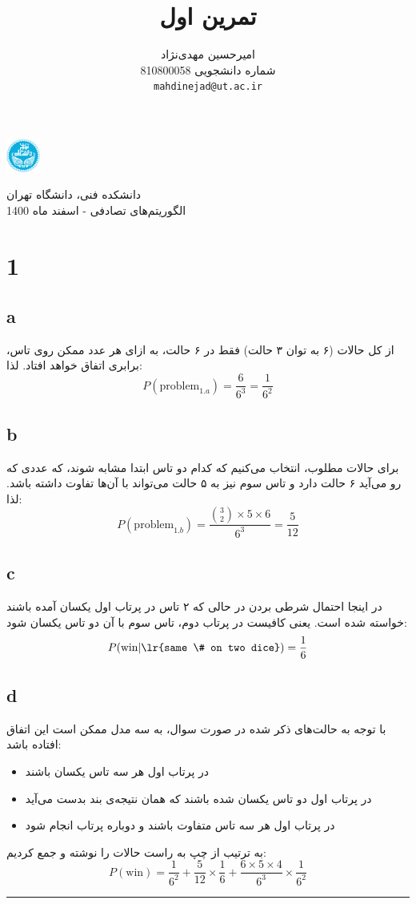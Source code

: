 \documentclass{article}
\title{
تمرین اول
}
\author{%
  امیرحسین مهدی‌نژاد\\
  شماره دانشجویی 810800058\\
  \texttt{mahdinejad@ut.ac.ir} \\
}
\begin{document}
\begin{minipage}{0.1\textwidth}%
\includegraphics[width=1.1cm]{Photos/UT_logo.png}
\end{minipage}%
\hfill%
\begin{minipage}{0.9\textwidth}\raggedleft
دانشکده فنی، دانشگاه تهران\\
الگوریتم‌های تصادفی -  
اسفند
ماه 1400\\
\end{minipage}

\makepertitle

\section*{1}
\subsection*{a}
از کل حالات
(۶ به توان ۳ حالت)
فقط در ۶ حالت، به ازای هر عدد ممکن روی تاس، برابری اتفاق خواهد افتاد. لذا:
$$ P(\text{problem}_{1.a}) = \frac{6}{6^3} = \frac{1}{6^2} $$

\subsection*{b}
برای حالات مطلوب، انتخاب می‌کنیم که کدام دو تاس ابتدا مشابه شوند، که عددی که رو می‌آید ۶ حالت دارد و تاس سوم نیز به ۵ حالت می‌تواند با آن‌ها تفاوت داشته باشد. لذا:
$$ P(\text{problem}_{1.b}) = \frac{\binom{3}{2} \times 5 \times 6}{6^3} = \frac{5}{12} $$

\subsection*{c}
در اینجا احتمال شرطی بردن در حالی که ۲ تاس در پرتاب اول یکسان آمده باشند خواسته شده است. یعنی کافیست در پرتاب دوم، تاس سوم با آن دو تاس یکسان شود:
$$ P(\text{win}|\text{\lr{same \# on two dice}}) = \frac{1}{6} $$

\subsection*{d}
با توجه به حالت‌های ذکر شده در صورت سوال، به سه مدل ممکن است این اتفاق افتاده باشد:
\begin{itemize}
    \item 
    در پرتاب اول هر سه تاس یکسان باشند
    \item
    در پرتاب اول دو تاس یکسان شده باشند که همان نتیجه‌ی بند
    بدست می‌آید
    \item
    در پرتاب اول هر سه تاس متفاوت باشند و دوباره پرتاب انجام شود
\end{itemize}
به ترتیب از چپ به راست حالات را نوشته و جمع کردیم:
$$ P(\text{win}) = \frac{1}{6^2} + \frac{5}{12} \times \frac{1}{6} + \frac{6 \times 5 \times 4}{6^3} \times \frac{1}{6^2}$$
\rule{\linewidth}{1pt}
\end{document}

